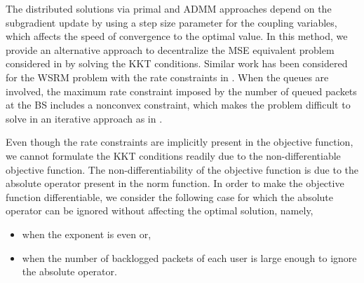 
The distributed solutions via primal and \ac{ADMM} approaches depend on the subgradient update by using a step size parameter for the coupling variables, which affects the speed of convergence to the optimal value.
In this method, we provide an alternative approach to decentralize the \ac{MSE} equivalent problem considered in \cite{christensen2008weighted,wmmse_shi} by solving the \ac{KKT} conditions. Similar work has been considered for the \ac{WSRM} problem with the rate constraints in \cite{kaleva2012weighted}. When the queues are involved, the maximum rate constraint imposed by the number of queued packets at the \ac{BS} includes a nonconvex constraint, which makes the problem difficult to solve in an iterative approach as in \cite{kaleva2012weighted}.

Even though the rate constraints are implicitly present in the objective function, we cannot formulate the \ac{KKT} conditions readily due to the non-differentiable objective function. The non-differentiability of the objective function is due to the absolute operator present in the norm function. In order to make the objective function differentiable, we consider the following case for which the absolute operator can be ignored without affecting the optimal solution, namely,
\begin{itemize}
\item when the exponent  is even or,
\item when the number of backlogged packets of each user is large enough  to ignore the absolute operator.
\end{itemize}

